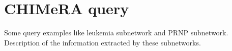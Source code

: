 \documentclass{standalone}
\begin{document}
\section[CHIMeRA query]{CHIMeRA query}\label{query}

Some query examples like leukemia subnetwork and PRNP subnetwork.
Description of the information extracted by these subnetworks. %
\end{document}
